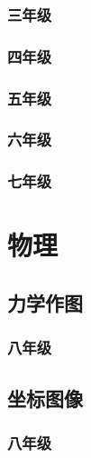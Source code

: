 \section*{三年级}


\section*{四年级}


\section*{五年级}


\section*{六年级}


\section*{七年级}


\part{物理}

\chapter{力学作图}

\section*{八年级}


\chapter{坐标图像}

\section*{八年级}



